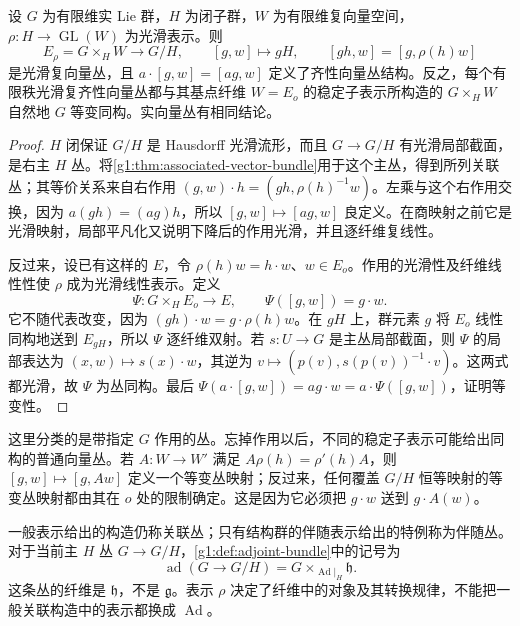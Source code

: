 \begin{proposition}\label{g1:prop:homogeneous-associated-bundle}
	设 \(G\) 为有限维实 Lie 群，\(H\) 为闭子群，\(W\) 为有限维复向量空间，\(\rho:H\to\operatorname{GL}(W)\) 为光滑表示。则
	\[
		E_\rho=G\times_H W\longrightarrow G/H,\qquad
		[g,w]\longmapsto gH,
		\qquad [gh,w]=[g,\rho(h)w]
	\]
	是光滑复向量丛，且 \(a\cdot[g,w]=[ag,w]\) 定义了齐性向量丛结构。反之，每个有限秩光滑复齐性向量丛都与其基点纤维 \(W=E_o\) 的稳定子表示所构造的 \(G\times_H W\) 自然地 \(G\) 等变同构。实向量丛有相同结论。
\end{proposition}
\begin{proof}
	\(H\) 闭保证 \(G/H\) 是 Hausdorff 光滑流形，而且 \(G\to G/H\) 有光滑局部截面，是右主 \(H\) 丛。将\cref{g1:thm:associated-vector-bundle}用于这个主丛，得到所列关联丛；其等价关系来自右作用 \((g,w)\cdot h=(gh,\rho(h)^{-1}w)\)。左乘与这个右作用交换，因为 \(a(gh)=(ag)h\)，所以 \([g,w]\mapsto[ag,w]\) 良定义。在商映射之前它是光滑映射，局部平凡化又说明下降后的作用光滑，并且逐纤维复线性。

	反过来，设已有这样的 \(E\)，令 \(\rho(h)w=h\cdot w\)、\(w\in E_o\)。作用的光滑性及纤维线性性使 \(\rho\) 成为光滑线性表示。定义
	\[
		\Psi:G\times_H E_o\longrightarrow E,\qquad
		\Psi([g,w])=g\cdot w.
	\]
	它不随代表改变，因为 \((gh)\cdot w=g\cdot\rho(h)w\)。在 \(gH\) 上，群元素 \(g\) 将 \(E_o\) 线性同构地送到 \(E_{gH}\)，所以 \(\Psi\) 逐纤维双射。若 \(s:U\to G\) 是主丛局部截面，则 \(\Psi\) 的局部表达为 \((x,w)\mapsto s(x)\cdot w\)，其逆为 \(v\mapsto(p(v),s(p(v))^{-1}\cdot v)\)。这两式都光滑，故 \(\Psi\) 为丛同构。最后 \(\Psi(a\cdot[g,w])=ag\cdot w=a\cdot\Psi([g,w])\)，证明等变性。
\end{proof}

这里分类的是带指定 \(G\) 作用的丛。忘掉作用以后，不同的稳定子表示可能给出同构的普通向量丛。若 \(A:W\to W'\) 满足 \(A\rho(h)=\rho'(h)A\)，则 \([g,w]\mapsto[g,Aw]\) 定义一个等变丛映射；反过来，任何覆盖 \(G/H\) 恒等映射的等变丛映射都由其在 \(o\) 处的限制确定。这是因为它必须把 \(g\cdot w\) 送到 \(g\cdot A(w)\)。

\ProseParagraphBreak
一般表示给出的构造仍称关联丛；只有结构群的伴随表示给出的特例称为伴随丛。对于当前主 \(H\) 丛 \(G\to G/H\)，\cref{g1:def:adjoint-bundle}中的记号为
\[
	\operatorname{ad}(G\to G/H)=G\times_{\operatorname{Ad}|_H}\mathfrak h.
\]
这条丛的纤维是 \(\mathfrak h\)，不是 \(\mathfrak g\)。表示 \(\rho\) 决定了纤维中的对象及其转换规律，不能把一般关联构造中的表示都换成 \(\operatorname{Ad}\)。

